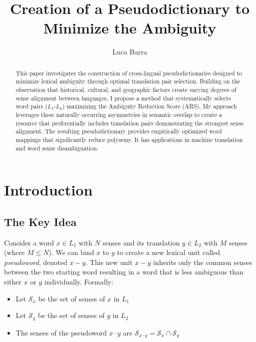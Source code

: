\documentclass[runningheads]{llncs}
\begin{document}
\title{Creation of a Pseudodictionary to Minimize the Ambiguity}

\graphicspath{{images/}}

\author{Luca Barra}



\maketitle

\begin{abstract}
This paper investigates the construction of cross-lingual pseudodictionaries designed to minimize lexical ambiguity through optimal translation pair selection. Building on the observation that historical, cultural, and geographic factors create varying degrees of sense alignment between languages, I propose a method that systematically selects word pairs ($L_1$-$L_k$) maximizing the Ambiguity Reduction Score (ARS). My approach leverages these naturally occurring asymmetries in semantic overlap to create a resource that preferentially includes translation pairs demonstrating the strongest sense alignment. The resulting pseudodictionary provides empirically optimized word mappings that significantly reduce polysemy. It has applications in machine translation and word sense disambiguation.
\end{abstract}

\section{Introduction}

\subsection{The Key Idea}

Consider a word $x \in L_1$ with $N$ senses and its translation $y \in L_2$ with $M$ senses (where $M \leq N$). We can bind $x$ to $y$ to create a new lexical unit called \textit{pseudoword}, denoted $x-y$. This new unit $x-y$ inherits only the common senses between the two starting word resulting in a word that is less ambiguous than either $x$ or $y$ individually. Formally:

\begin{itemize}
  \item Let $\mathcal{S}_x$ be the set of senses of $x$ in $L_1$
  \item Let $\mathcal{S}_y$ be the set of senses of $y$ in $L_2$
  \item The senses of the pseudoword $x \cdot y$ are $\mathcal{S}_{x \cdot y} = \mathcal{S}_x \cap \mathcal{S}_y$
\end{itemize}
\end{document}

